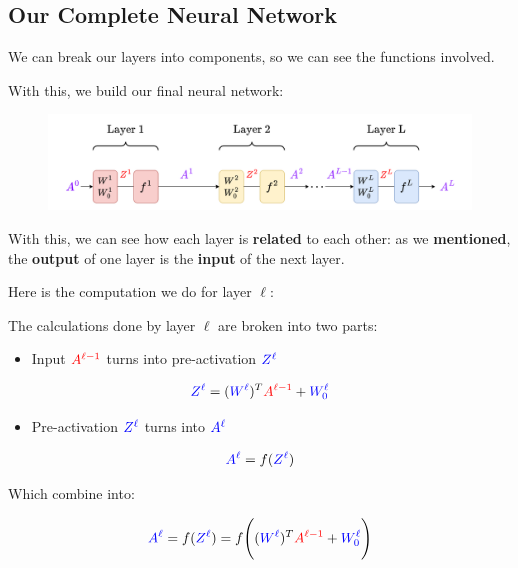     \subsection{Our Complete Neural Network}
    
        We can break our layers into components, so we can see the functions involved. 
        
        With this, we build our final neural network:
        
        \begin{figure}[H]
            \centering
            \includegraphics[width=140mm,scale=0.4]{images/nn_images/final_neural_network.png}
        \end{figure}
        
        With this, we can see how each layer is \textbf{related} to each other: as we \textbf{mentioned}, the \textbf{output} of one layer is the \textbf{input} of the next layer.
        
        Here is the computation we do for layer $\ell$:\\
        
        \begin{kequation}
            The calculations done by layer $\ell$ are broken into two parts:

            \begin{itemize}
                \item Input $\textcolor{red}{A^{\ell-1}}$ turns into pre-activation $\textcolor{blue}{Z^\ell}$
            \end{itemize}
            
            \begin{equation*}
                \textcolor{blue}{Z^\ell} = (\textcolor{blue}{W^\ell})^T \textcolor{red}{A^{\ell-1}} + \textcolor{blue}{W_0^\ell} 
            \end{equation*}
            
            \begin{itemize}
                \item Pre-activation $\textcolor{blue}{Z^\ell}$ turns into $\textcolor{blue}{A^\ell}$
            \end{itemize}
            
            \begin{equation*}
                \textcolor{blue}{A^\ell} = f(\textcolor{blue}{Z^\ell})
            \end{equation*}
            
            Which combine into:
            
            \begin{equation*}
                \textcolor{blue}{A^\ell} = f(\textcolor{blue}{Z^\ell}) = 
                f  
                \Bigg( 
                    (\textcolor{blue}{W^\ell})^T \textcolor{red}{A^{\ell-1}} + \textcolor{blue}{W_0^\ell} 
                \Bigg)
            \end{equation*}
        \end{kequation}

